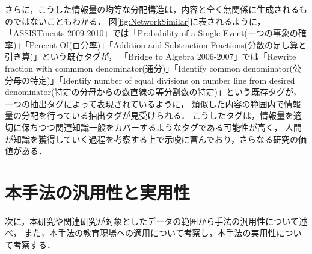 さらに，こうした情報量の均等な分配構造は，内容と全く無関係に生成されるものではないこともわかる．
図\ref{fig:NetworkSimilar}に表されるように，
「ASSISTments 2009-2010」では「Probability of a Single Event(一つの事象の確率)」「Percent Of(百分率)」「Addition and Subtraction Fractions(分数の足し算と引き算)」という既存タグが，
「Bridge to Algebra 2006-2007」では「Rewrite fraction with commmon denominator(通分)」「Identify common denominator(公分母の特定)」「Identify number of equal divisions on number line from desired denominator(特定の分母からの数直線の等分割数の特定)」という既存タグが，一つの抽出タグによって表現されているように，
類似した内容の範囲内で情報量の分配を行っている抽出タグが見受けられる．
こうしたタグは，情報量を適切に保ちつつ関連知識一般をカバーするようなタグである可能性が高く，
人間が知識を獲得していく過程を考察する上で示唆に富んでおり，さらなる研究の価値がある．



\section{本手法の汎用性と実用性}
次に，本研究や関連研究が対象としたデータの範囲から手法の汎用性について述べ，
また，本手法の教育現場への適用について考察し，本手法の実用性について考察する．
%
%
%



